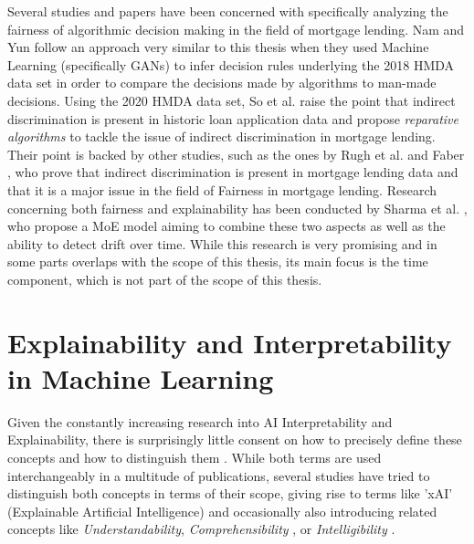Several studies and papers have been concerned with specifically analyzing the fairness of algorithmic decision making in the field of mortgage lending.
Nam and Yun \parencite{Nam2022} follow an approach very similar to this thesis when they used Machine Learning (specifically GANs) to infer decision rules underlying the 2018 HMDA data set in order to compare the decisions made by algorithms to man-made decisions.
Using the 2020 HMDA data set, So et al. \parencite{So2022} raise the point that indirect discrimination is present in historic loan application data and propose \textit{reparative algorithms} to tackle the issue of indirect discrimination in mortgage lending.
Their point is backed by other studies, such as the ones by Rugh et al. \parencite{Rugh2015} and Faber \parencite{Faber2013}, who prove that indirect discrimination is present in mortgage lending data and that it is a major issue in the field of Fairness in mortgage lending.
Research concerning both fairness and explainability has been conducted by Sharma et al. \parencite{Sharma2022}, who propose a MoE model aiming to combine these two aspects as well as the ability to detect drift over time.
While this research is very promising and in some parts overlaps with the scope of this thesis, its main focus is the time component, which is not part of the scope of this thesis.

\section{Explainability and Interpretability in Machine Learning}\label{sec:explainability}

Given the constantly increasing research into AI Interpretability and Explainability, there is surprisingly little consent on how to precisely define these concepts and how to distinguish them \parencite{Linardatos2021}. 
While both terms are used interchangeably in a multitude of publications, several studies have tried to distinguish both concepts in terms of their scope, giving rise to terms like 'xAI' (Explainable Artificial Intelligence) \parencite{Gunning2019} and occasionally also introducing related concepts like \textit{Understandability}, \textit{Comprehensibility} \parencite{Guidotti2018}, or \textit{Intelligibility} \parencite{Caruana2015}.

